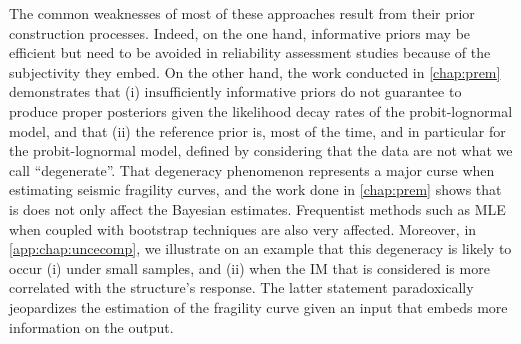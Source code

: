 The common 
weaknesses of most of these approaches result from  %
their prior construction processes.  
Indeed, on the one hand, informative priors may be efficient but need to be 
avoided in reliability assessment studies because of the subjectivity they embed.
On the other hand, the work conducted in   \cref{chap:prem} demonstrates that (i) insufficiently informative priors do not guarantee to produce proper posteriors given the likelihood decay rates of the probit-lognormal model, and that (ii)  
the reference prior is, most of the time, and in particular for the probit-lognormal model, defined by considering that the data are not what we call ``degenerate''. %
%
That degeneracy phenomenon represents a major curse when estimating seismic fragility curves, and the work done in   \cref{chap:prem} shows that is does not only affect the Bayesian estimates. Frequentist methods such as MLE when coupled with bootstrap techniques are also very affected.
Moreover, in   \cref{app:chap:uncecomp}, we illustrate on an example that this degeneracy is likely to occur (i) under small samples, and (ii) when the IM that is considered is more correlated with the structure's response.
The latter statement paradoxically jeopardizes the estimation of the fragility curve given an input that embeds more information on the output. %











